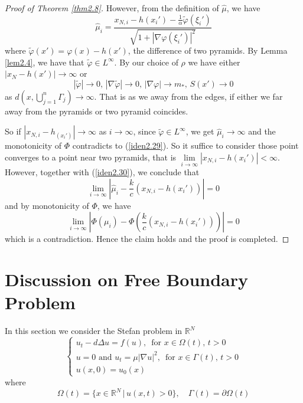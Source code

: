 \documentclass[12pt, a4paper]{article}
\numberwithin{equation}{section}
\newcommand{\R}{\mathbb{R}}
\newcommand{\hmu}{\hat{\mu}}
\begin{document}
\begin{CJK}{UTF8}{bkai}
\begin{proof}[Proof of Theorem \ref{thm2.8}]
However, from the definition of $\hmu$, we have
\[
	\hmu_i=\frac{x_{N,i}-h(x_i')-\frac{1}{\alpha}\tilde{\varphi}(\xi_i')}{\sqrt{1+|\nabla\varphi(\xi_i')|^2}}
\]
where $\tilde{\varphi}(x')=\varphi(x)-h(x')$, the difference of two pyramids. By Lemma \ref{lem2.4}, we have that $\tilde{\varphi}\in L^\infty$. By our choice of $\rho$ we have either $|x_N-h(x')|\to\infty$ or
\begin{equation}\label{iden2.30}
	|\tilde{\varphi}|\to0,\,|\nabla\tilde{\varphi}|\to0,\,|\nabla\varphi|\to m_*,\,S(x')\to0
\end{equation}
as $d(x,\bigcup\limits_{j=1}^n\Gamma_j)\to\infty$. That is as we away from the edges, if either we far away from the pyramids or two pyramid coincides.

So if $|x_{N,i}-h_(x_i')|\to\infty$ as $i\to\infty$, since $\tilde{\varphi}\in L^\infty$, we get $\hmu_i\to\infty$ and the monotonicity of $\Phi$ contradicts to (\ref{iden2.29}). So it suffice to consider those point converges to a point near two pyramids, that is $\lim\limits_{i\to\infty}|x_{N,i}-h(x_i')|<\infty$. However, together with (\ref{iden2.30}), we conclude that
\[
	\lim_{i\to\infty}\left|\hat{\mu}_i-\frac{k}{c}(x_{N,i}-h(x_i'))\right|=0
\]
and by monotonicity of $\Phi$, we have
\[
	\lim_{i\to\infty}\left|\Phi(\mu_i)-\Phi\left(\frac{k}{c}(x_{N,i}-h(x_i'))\right)\right|=0
\]
which is a contradiction. Hence the claim holds and the proof is completed.

\end{proof}










\section{Discussion on Free Boundary Problem}
	In this section we consider the Stefan problem in $\R^N$
\begin{equation}\label{iden3.1}
\begin{cases}
	u_t-d\Delta u=f(u),\,\mbox{ for }x\in\Omega(t),\,t>0\\
	u=0\mbox{ and }u_t=\mu|\nabla u|^2,\,\mbox{ for }x\in\Gamma(t),\,t>0\\
	u(x,0)=u_0(x)
\end{cases}
\end{equation}
where 
\[
	\Omega(t)=\{x\in\R^N\,|\, u(x,t)>0\},\quad\Gamma(t)=\partial\Omega(t)
\]


\end{CJK}
\end{document}
